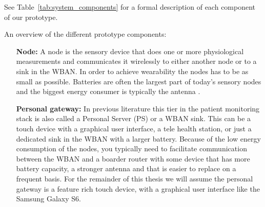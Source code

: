 See Table~\ref{tab:system_components} for a formal description of each component of our prototype.


An overview of the different prototype components:
\begin{itemize}

  \item[\textbf{Node:}] A node is the sensory device that does one or more physiological measurements and communicates it wirelessly to either another node or to a sink in the WBAN. In order to achieve wearability the nodes has to be as small as possible. Batteries are often the largest part of today’s sensory nodes and the biggest energy consumer is typically the antenna \cite{Ullah:2010ci}.


  \item[\textbf{Personal gateway:}] In previous literature this tier in the patient monitoring stack is also called a Personal Server (PS) or a WBAN sink. This can be a touch device with a graphical user interface, a tele health station, or just a dedicated sink in the WBAN with a larger battery. Because of the low energy consumption of the nodes, you typically need to facilitate communication between the WBAN and a boarder router with some device that has more battery capacity, a stronger antenna and that is easier to replace on a frequent basis. For the remainder of this thesis we will assume the personal gateway is a feature rich touch device, with a graphical user interface like the Samsung Galaxy S6.



\end{itemize}
